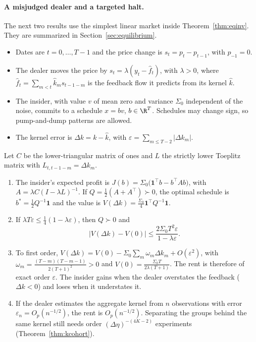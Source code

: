 \paragraph{A misjudged dealer and a targeted halt.} The next two results use the simplest linear market inside Theorem~\ref{thm:eqinv}. They are summarized in Section~\ref{sec:equilibrium}.
\begin{itemize}[itemsep=1pt,topsep=2pt]
\item Dates are $t=0,\ldots,T-1$ and the price change is $s_t=p_t-p_{t-1}$, with $p_{-1}=0$.
\item The dealer moves the price by $s_t=\lambda(y_t-\hat f_t)$, with $\lambda>0$, where $\hat f_t=\sum_{m<t}\hat k_ms_{t-1-m}$ is the feedback flow it predicts from its kernel $\hat k$.
\item The insider, with value $v$ of mean zero and variance $\Sigma_0$ independent of the noise, commits to a schedule $x=bv$, $b\in\R^T$. Schedules may change sign, so pump-and-dump patterns are allowed.
\item The kernel error is $\Delta k=k-\hat k$, with $\varepsilon=\sum_{m\le T-2}|\Delta k_m|$.
\end{itemize}
Let $C$ be the lower-triangular matrix of ones and $L$ the strictly lower Toeplitz matrix with $L_{t,t-1-m}=\Delta k_m$.

\begin{theorem}\label{thm:rents}
\begin{enumerate}[label=(\roman*),itemsep=1pt]
\item The insider's expected profit is $J(b)=\Sigma_0\bigl(\mathbf 1^\top b-b^\top A b\bigr)$, with $A=\lambda C(I-\lambda L)^{-1}$. If $Q=\tfrac12(A+A^\top)\succ0$, the optimal schedule is $b^*=\tfrac12Q^{-1}\mathbf1$ and the value is $V(\Delta k)=\tfrac{\Sigma_0}4\mathbf1^\top Q^{-1}\mathbf1$.
\item If $\lambda T\varepsilon\le\tfrac14(1-\lambda\varepsilon)$, then $Q\succ0$ and
\[
 |V(\Delta k)-V(0)|\le\frac{2\Sigma_0T^2\varepsilon}{1-\lambda\varepsilon}.
\]
\item To first order, $V(\Delta k)=V(0)-\Sigma_0\sum_m\omega_m\Delta k_m+O(\varepsilon^2)$, with $\omega_m=\frac{(T-m)(T-m-1)}{2(T+1)^2}>0$ and $V(0)=\frac{\Sigma_0T}{2\lambda(T+1)}$. The rent is therefore of exact order $\varepsilon$. The insider gains when the dealer overstates the feedback ($\Delta k<0$) and loses when it understates it.
\item If the dealer estimates the aggregate kernel from $n$ observations with error $\varepsilon_n=O_p(n^{-1/2})$, the rent is $O_p(n^{-1/2})$. Separating the groups behind the same kernel still needs order $(\Delta\eta)^{-(4K-2)}$ experiments (Theorem~\ref{thm:kcohort}).
\end{enumerate}
\end{theorem}

